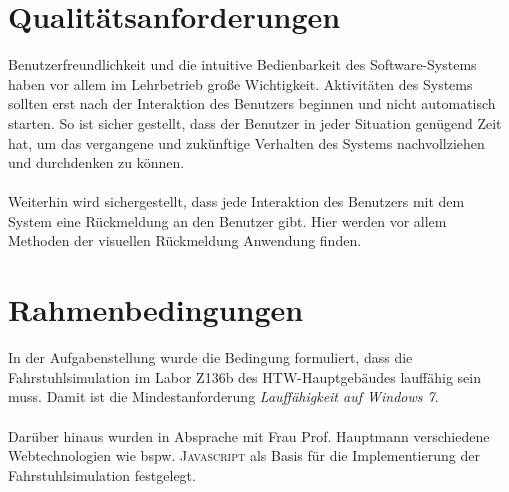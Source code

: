 \section{Qualitätsanforderungen}
Benutzerfreundlichkeit und die intuitive Bedienbarkeit des Software-Systems haben vor allem im Lehrbetrieb große Wichtigkeit. Aktivitäten des Systems sollten erst nach der Interaktion des Benutzers beginnen und nicht automatisch starten. So ist sicher gestellt, dass der Benutzer in jeder Situation ge\-nügend Zeit hat, um das vergangene und zukünftige Verhalten des Systems nachvollziehen und durchdenken zu können. 

\paragraph{}
Weiterhin wird sichergestellt, dass jede Interaktion des Benutzers mit dem System eine Rückmeldung an den Benutzer gibt. Hier werden vor allem Methoden der visuellen Rückmeldung Anwendung finden.

\section{Rahmenbedingungen}
In der Aufgabenstellung wurde die Bedingung formuliert, dass die \gls{Fahrstuhlsimulation} im Labor Z136b des HTW-Hauptgebäudes lauffähig sein muss. Damit ist die Mindestanforderung \textit{Lauffähigkeit auf Windows 7}. 

\paragraph{}
Darüber hinaus wurden in Absprache mit Frau Prof. Hauptmann verschiedene Webtechnologien wie bspw. \textsc{Javascript} als Basis für die Implementierung der \gls{Fahrstuhlsimulation} festgelegt. 
